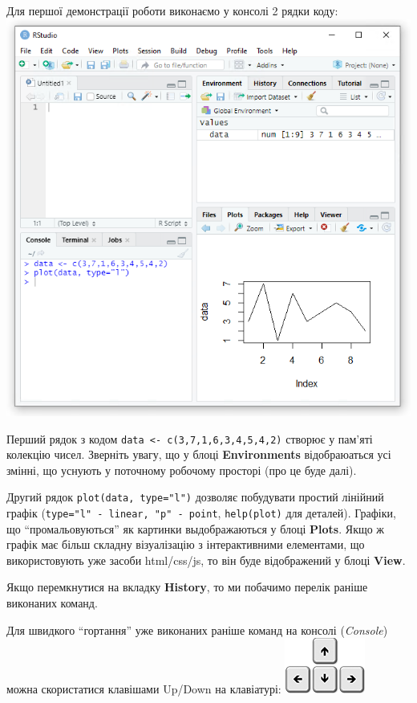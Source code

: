 \documentclass[
]{book}
\begin{document}
Для першої демонстрації роботи виконаємо у консолі 2 рядки коду:
\includegraphics{images/chapter1/rstudio_4.png}

Перший рядок з кодом \texttt{data\ \textless{}-\ c(3,7,1,6,3,4,5,4,2)} створює у пам'яті колекцію чисел. Зверніть увагу, що у блоці \textbf{Environments} відобраюаться усі змінні, що уснують у поточному робочому просторі (про це буде далі).

Другий рядок \texttt{plot(data,\ type="l")} дозволяє побудувати простий лінійний графік (\texttt{type="l"\ -\ linear,\ "p"\ -\ point}, \texttt{help(plot)} для деталей). Графіки, що ``промальовуються'' як картинки выдображаються у блоці \textbf{Plots}. Якщо ж графік має більш складну візуалізацію з інтерактивними елементами, що використовують уже засоби html/css/js, то він буде відображений у блоці \textbf{View}.

Якщо перемкнутися на вкладку \textbf{History}, то ми побачимо перелік раніше виконаних команд.

Для швидкого ``гортання'' уже виконаних раніше команд на консолі (\emph{Console}) можна скористатися клавішами Up/Down на клавіатурі:
\includegraphics{images/chapter1/arrow_keys.png}
\end{document}
